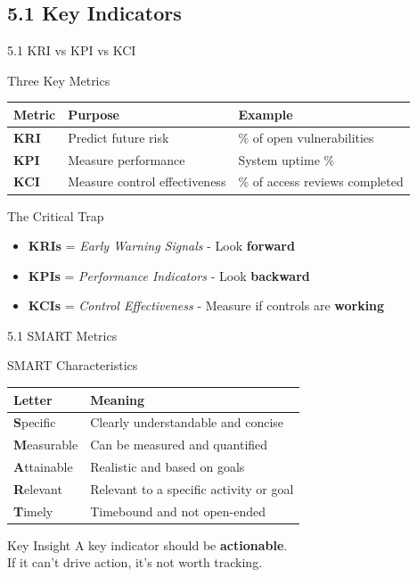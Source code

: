 \documentclass{beamer}
\begin{document}
	\subsection{5.1 Key Indicators}
	\begin{frame}{5.1 KRI vs KPI vs KCI}
		\begin{block}{Three Key Metrics}
			\begin{tabular}{|p{2.5cm}|p{4cm}|p{4.5cm}|}
				\hline
				\textbf{Metric} & \textbf{Purpose} & \textbf{Example} \\
				\hline
				\textbf{KRI} & Predict future risk & \% of open vulnerabilities \\
				\hline
				\textbf{KPI} & Measure performance & System uptime \% \\
				\hline
				\textbf{KCI} & Measure control effectiveness & \% of access reviews completed \\
				\hline
			\end{tabular}
		\end{block}
		
		\begin{alertblock}{The Critical Trap}
			\begin{itemize}
				\item \textbf{KRIs} = \textit{Early Warning Signals} - Look \textbf{forward}
				\item \textbf{KPIs} = \textit{Performance Indicators} - Look \textbf{backward}
				\item \textbf{KCIs} = \textit{Control Effectiveness} - Measure if controls are \textbf{working}
			\end{itemize}
		\end{alertblock}
	\end{frame}
	
	\begin{frame}{5.1 SMART Metrics}
		\begin{block}{SMART Characteristics}
			\begin{tabular}{|p{2.5cm}|p{8.5cm}|}
				\hline
				\textbf{Letter} & \textbf{Meaning} \\
				\hline
				\textbf{S}pecific & Clearly understandable and concise \\
				\hline
				\textbf{M}easurable & Can be measured and quantified \\
				\hline
				\textbf{A}ttainable & Realistic and based on goals \\
				\hline
				\textbf{R}elevant & Relevant to a specific activity or goal \\
				\hline
				\textbf{T}imely & Timebound and not open-ended \\
				\hline
			\end{tabular}
		\end{block}
		
		\begin{exampleblock}{Key Insight}
			A key indicator should be \textbf{actionable}. \\
			If it can't drive action, it's not worth tracking.
		\end{exampleblock}
	\end{frame}
	
\end{document}
